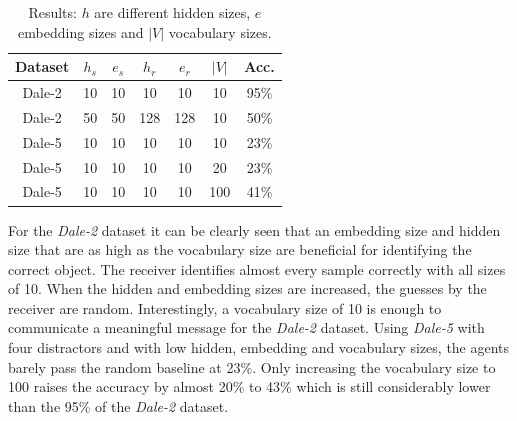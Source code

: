 \documentclass[11pt]{article}
\begin{document}
\begin{table}
  \centering
  \begin{tabular}{c|ccccc|c}
    \hline
    \textbf{Dataset} & $h_{s}$ & $e_{s}$ & $h_{r}$ & $e_{r}$ & $|V|$ & \textbf{Acc.} \\
    \hline
    Dale-2           & {10}    & {10}    & {10}    & {10}    & {10}  & {95\%}        \\
    Dale-2           & {50}    & {50}    & {128}   & {128}   & {10}  & {50\%}        \\
    Dale-5           & {10}    & {10}    & {10}    & {10}    & {10}  & {23\%}        \\
    Dale-5           & {10}    & {10}    & {10}    & {10}    & {20}  & {23\%}        \\
    Dale-5           & {10}    & {10}    & {10}    & {10}    & {100} & {41\%}        \\
    \hline
  \end{tabular}
  \caption{Results: $h$ are different hidden sizes, $e$ embedding sizes and $|V|$ vocabulary sizes.}
  \label{tab:results}
\end{table}

For the \emph{Dale-2} dataset it can be clearly seen that an embedding size and hidden size that are as high as the vocabulary size are beneficial for identifying the correct object.
The receiver identifies almost every sample correctly with all sizes of 10.
When the hidden and embedding sizes are increased, the guesses by the receiver are random.
Interestingly, a vocabulary size of 10 is enough to communicate a meaningful message for the \emph{Dale-2} dataset.
%
%
Using \emph{Dale-5} with four distractors and with low hidden, embedding and vocabulary sizes, the agents barely pass the random baseline at 23\%.
Only increasing the vocabulary size to 100 raises the accuracy by almost 20\% to 43\% which is still considerably lower than the 95\% of the \emph{Dale-2} dataset.

\end{document}
